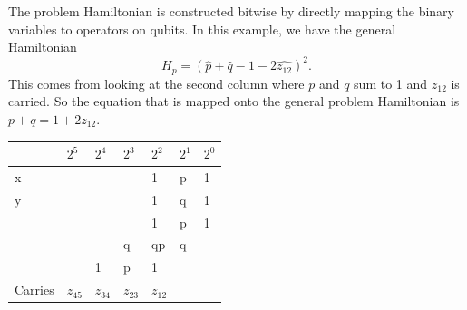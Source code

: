 \documentclass[%
 reprint,
 amsmath,amssymb,
 aps,
]{revtex4-1}
\begin{document}
   The problem Hamiltonian is constructed bitwise by directly mapping the binary variables to operators on qubits\cite{Xu2012}. In this example, we have the general Hamiltonian 
	\begin{equation}	
	H_p = \left( \hat{p} + \hat{q} -1 -2\hat{z_{12}} \right)^2 .
	\end{equation}
This comes from looking at the second column where $p$ and $q$ sum to 1 and $z_{12}$ is carried. So the equation that is mapped onto the general problem Hamiltonian is $p+q=1+2z_{12}$.

\begin{table}
\begin{flushleft}
\begin{tabular}{ p{1.7cm}  p{1cm} p{1cm} p{1cm} p{1cm} p{1cm} p{1cm}} \hline\hline
 & \textit{$2^5$}  & \textit{$2^4$}  & \textit{$2^3$}
& \textit{$2^2$}   & \textit{$2^1$} & \textit{$2^0$} \\ \hline

x &\hspace{0.1cm} &\hspace{0.1cm} &\hspace{0.1cm} &1 &p &1 \\ 

y &\hspace{0.1cm} &\hspace{0.1cm} &\hspace{0.1cm} &1 &q &1 \\ 

\hspace{0.1cm} &\hspace{0.1cm} &\hspace{0.1cm} &\hspace{0.1cm} &1 &p &1 \\ 

\hspace{0.1cm} &\hspace{0.1cm} &\hspace{0.1cm} &q  &qp &q &\hspace{0.1cm} \\ 

\hspace{0.1cm} &\hspace{0.1cm} &1 &p  &1 &\hspace{0.1cm} &\hspace{0.1cm} \\ 

Carries &$z_{45}$ &$z_{34}$ &$z_{23}$ &$z_{12}$ &\hspace{0.1cm} &\hspace{0.1cm} \\ 


\end{tabular}
\end{flushleft}
\end{table}
\end{document}
